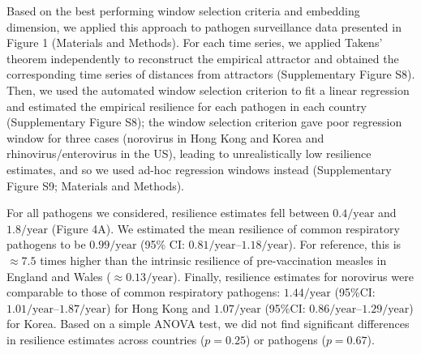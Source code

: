 \documentclass[12pt]{article}
\begin{document}
Based on the best performing window selection criteria and embedding dimension, we applied this approach to pathogen surveillance data presented in Figure 1 (Materials and Methods).
For each time series, we applied Takens' theorem independently to reconstruct the empirical attractor and obtained the corresponding time series of distances from attractors (Supplementary Figure S8).
Then, we used the automated window selection criterion to fit a linear regression and estimated the empirical resilience for each pathogen in each country (Supplementary Figure S8);
the window selection criterion gave poor regression window for three cases (norovirus in Hong Kong and Korea and rhinovirus/enterovirus in the US), leading to unrealistically low resilience estimates, and so we used ad-hoc regression windows instead (Supplementary Figure S9; Materials and Methods).

For all pathogens we considered, resilience estimates fell between $0.4/\mathrm{year}$ and $1.8/\mathrm{year}$ (Figure 4A).
We estimated the mean resilience of common respiratory pathogens to be $0.99/\mathrm{year}$ (95\% CI: $0.81/\mathrm{year}$--$1.18/\mathrm{year}$).
For reference, this is $\approx 7.5$ times higher than the intrinsic resilience of pre-vaccination measles in England and Wales ($\approx 0.13/\mathrm{year}$).
Finally, resilience estimates for norovirus were comparable to those of common respiratory pathogens: $1.44/\mathrm{year}$ (95\%CI: $1.01/\mathrm{year}$--$1.87/\mathrm{year}$) for Hong Kong and $1.07/\mathrm{year}$ (95\%CI: $0.86/\mathrm{year}$--$1.29/\mathrm{year}$) for Korea.
Based on a simple ANOVA test, we did not find significant differences in resilience estimates across countries ($p=0.25$) or pathogens ($p=0.67$).
\end{document}
